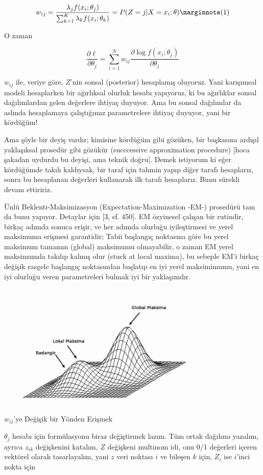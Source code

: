 \documentclass[12pt,fleqn]{article}\usepackage{../../common}
\begin{document}
$$  
 w_{ij} 
= \frac{\lambda_j f(x_i;\theta_j)}{\sum _{k=1}^{K} \lambda_k f(x_i;\theta_k)} 
= P(Z=j | X=x_i;\theta)
\mlabel{1}
$$

O zaman 

$$ \frac{\partial \ell}{\partial \theta_j}  = \sum _{i=1}^{N}
w_{ij} \frac{\partial \log f(x_i;\theta_j)}{\partial \theta_j}
$$

$w_{ij}$ ile, veriye göre, $Z$'nin sonsal (posterior) hesaplamış oluyoruz. Yani
karışımsal modeli hesaplarken bir ağırlıksal olurluk hesabı yapıyoruz, ki bu
ağırlıklar sonsal dağılımlardan gelen değerlere ihtiyaç duyuyor. Ama bu sonsal
dağılımlar da aslında hesaplamaya çalıştığımız parametrelere ihtiyaç duyuyor,
yani bir kördüğüm!

Ama şöyle bir deyiş vardır; kimisine kördüğüm gibi gözüken, bir başkasına
ardışıl yaklaşıksal prosedür gibi gözükür (succcessive approximation procedure)
[hoca şakadan uydurdu bu deyişi, ama teknik doğru]. Demek istiyorum ki eğer
kördüğümde takılı kaldıysak, bir taraf için tahmin yapıp diğer tarafı
hesaplarız, sonra bu hesaplanan değerleri kullanarak ilk tarafı hesaplarız. Bunu
sürekli devam ettiririz.

Ünlü Beklenti-Maksimizasyon (Expectation-Maximization -EM-) prosedürü tam da
bunu yapıyor. Detaylar için [3, sf. 450]. EM özyinesel çalışan bir rutindir,
birkaç adımda sonuca erişir, ve her adımda olurluğu iyileştirmesi ve yerel
maksimuma erişmesi garantidir; Tabii başlangıç noktasına göre bu yerel maksimum
tamamın (global) maksimumu olmayabilir, o zaman EM yerel maksimumda takılıp
kalmış olur (stuck at local maxima), bu sebeple EM'i birkaç değişik rasgele
başlangıç noktasından başlatıp en iyi yerel maksimimumu, yani en iyi olurluğu
veren parametreleri bulmak iyi bir yaklaşımdır.

\includegraphics[height=6cm]{localmax.png}

$w_{ij}$'ye Değişik bir Yönden Erişmek

$\theta_j$ hesabı için formülasyonu biraz değiştirmek lazım. Tüm ortak dağılımı
yazalım, ayrıca $z_{ik}$ değişkenini katalım, $Z$ değişkeni multinom idi, onu
0/1 değerleri içeren vektörel olarak tasarlayalım, yani $z$ veri noktası $i$ ve
bileşen $k$ için, $Z_i$ ise $i$'inci nokta için
\end{document}
